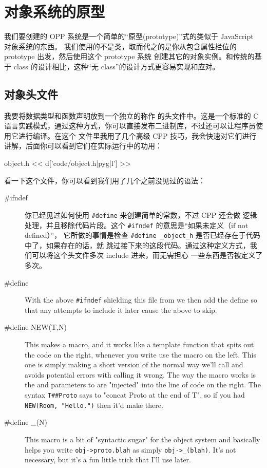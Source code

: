 \section{对象系统的原型}

我们要创建的 OPP 系统是一个简单的“原型(prototype)”式的类似于 JavaScript 对象系统的东西。
我们使用的不是类，取而代之的是你从包含属性栏位的 prototype 出发，然后使用这个 prototype 系统
创建其它的对象实例。和传统的基于 class 的设计相比，这种“无 class”的设计方式更容易实现和应对。

\subsection{对象头文件}

我要将数据类型和函数声明放到一个独立的称作  的头文件中。这是一个标准的 C 
语言实践模式，通过这种方式，你可以直接发布二进制库，不过还可以让程序员使用它进行编译。在这个
文件里我用了几个高级 CPP 技巧，我会快速对它们进行讲解，后面你可以看到它们在实际运行中的功用：

\begin{code}{object.h}
<< d['code/object.h|pyg|l'] >>
\end{code}

看一下这个文件，你可以看到我们用了几个之前没见过的语法：

\begin{description}

\item[\#ifndef] 你已经见过如何使用 \verb|#define| 来创建简单的常数，不过 CPP 还会做
    逻辑处理，并且移除代码片段。这个 \verb|#ifndef| 的意思是“如果未定义（if not defined）”，
    它所做的事情是检查 \verb|#define _object_h| 是否已经存在于代码中了，如果存在的话，就
    跳过接下来的这段代码。通过这种定义方式，我们可以将这个头文件多次 include 进来，而无需担心
    一些东西是否被定义了多次。
\item[\#define] With the above \verb|#ifndef| shielding this file from we then
    add the  define so that any attempts to include it later
    cause the above to skip.
\item[\#define NEW(T,N)]  This makes a macro, and it works like a template function
    that spits out the code on the right, whenever you write use the macro
    on the left.  This one is simply making a short version of the normal way
    we'll call  and avoids potential errors with calling it
    wrong.  The way the macro works is the  and  parameters
    to  are "injected" into the line of code on the right.  The
    syntax \verb|T##Proto| says to "concat Proto at the end of T", so if you had
    \verb|NEW(Room, "Hello.")| then it'd make  there.
\item[\#define \_(N)] This macro is a bit of "syntactic sugar" for the object
    system and basically helps you write \verb|obj->proto.blah| as simply
    \verb|obj->_(blah)|.  It's not necessary, but it's a fun little trick
    that I'll use later.
\end{description}

